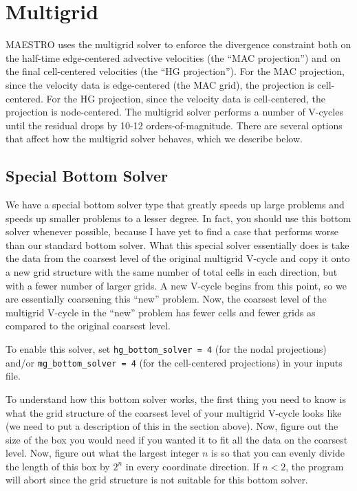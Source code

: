 \section{Multigrid}

MAESTRO uses the multigrid solver to enforce the divergence constraint
both on the half-time edge-centered advective velocities (the ``MAC
projection'') and on the final cell-centered velocities (the ``HG
projection'').  For the MAC projection, since the velocity data is
edge-centered (the MAC grid), the projection is cell-centered.  For
the HG projection, since the velocity data is cell-centered, the
projection is node-centered.   The multigrid solver performs a number
of V-cycles until the residual drops by 10-12 orders-of-magnitude.
There are several options that affect how the multigrid solver
behaves, which we describe below.

\subsection{Special Bottom Solver}
We have a special bottom solver type that greatly speeds up large problems
and speeds up smaller problems to a lesser degree.
In fact, you should use this bottom solver whenever possible, because I
have yet to find a case that performs worse than our standard bottom solver.
What this special solver essentially does is take the data from the coarsest 
level of the original multigrid V-cycle and copy it onto a new grid structure 
with the same number of total cells in each direction, but with a fewer number of larger 
grids.  A new V-cycle begins from this point, 
so we are essentially coarsening this ``new'' problem.
Now, the coarsest level of the multigrid V-cycle in the ``new'' problem has 
fewer cells and fewer grids as compared to the original coarsest level.

To enable this solver, set {\tt hg\_bottom\_solver = 4} (for the nodal
projections) and/or {\tt mg\_bottom\_solver = 4} (for the cell-centered
projections) in your inputs file.

To understand how this bottom solver works, the first thing you need to know
is what the grid structure of the coarsest level of your multigrid V-cycle
looks like (we need to put a description of this in the section above).
Now, figure out the size of the box you would need if you
wanted it to fit all the data on the coarsest level.  Now, figure out what
the largest integer $n$ is so that you can evenly divide the length of this box
by $2^n$ in every coordinate direction.  If $n < 2$, the program will abort
since the grid structure is not suitable for this bottom solver.

